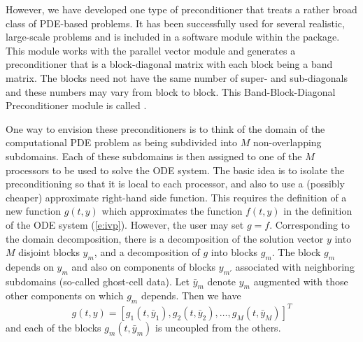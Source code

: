 However, we have developed one type of preconditioner that treats a
rather broad class of PDE-based problems.  It has been successfully
used for several realistic, large-scale problems \cite{HiTa:98} and is
included in a software module within the {\cvode} package. This module
works with the parallel vector module {\nvecp} and 
generates a preconditioner that is a block-diagonal matrix with each
block being a band matrix. The blocks need not have the same number of
super- and sub-diagonals and these numbers may vary from block to
block. This Band-Block-Diagonal Preconditioner module is called
{\cvbbdpre}.

One way to envision these preconditioners is to think of the domain of
the computational PDE problem as being subdivided into $M$ non-overlapping
subdomains.  Each of these subdomains is then assigned to one of the
$M$ processors to be used to solve the ODE system. The basic idea is
to isolate the preconditioning so that it is local to each processor,
and also to use a (possibly cheaper) approximate right-hand side
function. This requires the definition of a new function $g(t,y)$
which approximates the function $f(t, y)$ in the definition of the ODE
system (\ref{e:ivp}). However, the user may set $g = f$.  Corresponding
to the domain decomposition, there is a decomposition of the solution
vector $y$ into $M$ disjoint blocks $y_m$, and a decomposition of $g$
into blocks $g_m$.  The block $g_m$ depends on $y_m$ and also on
components of blocks $y_{m'}$ associated with neighboring subdomains
(so-called ghost-cell data).  Let $\bar{y}_m$ denote $y_m$ augmented
with those other components on which $g_m$ depends.  Then we have
\begin{equation}
  g(t,y) = [g_1(t,\bar{y}_1), g_2(t,\bar{y}_2), \ldots, g_M(t,\bar{y}_M)]^T
\end{equation}
and each of the blocks $g_m(t, \bar{y}_m)$ is uncoupled from the others.

